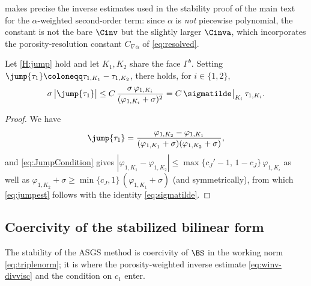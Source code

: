 \begin{remark}\label{rem:winvconst}
 makes precise the inverse estimates used in the stability proof of the
main text for the $\alpha$-weighted second-order term: since $\alpha$ is \emph{not}
piecewise polynomial, the constant is not the bare $\Cinv$ but the slightly larger
$\Cinva$, which incorporates the porosity-resolution constant $C_{\nabla\alpha}$ of
\eqref{eq:resolved}. 
\end{remark}

\begin{lemma}\label{lem:jump}
Let \cref{H:jump} hold and let $K_1,K_2$ share the face $\Gamma^b$. Setting
$\jump{\tau_1}\coloneqq\tau_{1,K_1}-\tau_{1,K_2}$, there holds, for $i\in\{1,2\}$,
\begin{equation}\label{eq:jumpest}
  \sigma\,\bigl|\jump{\tau_1}\bigr|
  \le C\,\frac{\sigma\,\varphi_{1,K_i}}{(\varphi_{1,K_i}+\sigma)^2}
  = C\,\sigmatilde\big|_{K_i}\,\tau_{1,K_i}.
\end{equation}
\end{lemma}

\begin{proof}
We have
\begin{equation*}
  \jump{\tau_1}
  = \frac{\varphi_{1,K_2}-\varphi_{1,K_1}}
  {(\varphi_{1,K_1}+\sigma)(\varphi_{1,K_2}+\sigma)} ,
\end{equation*}
and \eqref{eq:JumpCondition} gives
$|\varphi_{1,K_1}-\varphi_{1,K_2}|\le
\max\{c_J'-1,\,1-c_J\}\,\varphi_{1,K_i}$ as well as
$\varphi_{1,K_2}+\sigma\ge \min\{c_J,1\}\,(\varphi_{1,K_1}+\sigma)$ (and symmetrically),
from which \eqref{eq:jumpest} follows with the identity \eqref{eq:sigmatilde}.
\end{proof}

\subsection{Coercivity of the stabilized bilinear form}\label{sec:coercivity}
The stability of the ASGS method is coercivity of $\BS$ in the working norm
\eqref{eq:triplenorm}; it is where the porosity-weighted inverse estimate
\eqref{eq:winv-divvisc} and the condition on $c_1$ enter.

